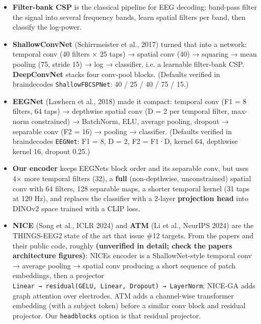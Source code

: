 \documentclass[
  11pt,
]{article}
\providecommand{\tightlist}{%
  \setlength{\itemsep}{0pt}\setlength{\parskip}{0pt}}
\renewcommand{\_}{\oldunderscore\allowbreak}
\begin{document}
\begin{itemize}
\tightlist
\item
  \textbf{Filter-bank CSP} is the
  classical pipeline for EEG decoding:
  band-pass filter the signal into
  several frequency bands, learn spatial
  filters per band, then classify the
  log-power.
\item
  \textbf{ShallowConvNet} (Schirrmeister
  et al., 2017) turned that into a
  network: temporal conv (40 filters ×
  25 taps) → spatial conv (40) →
  squaring → mean pooling (75, stride
  15) → log → classifier, i.e. a
  learnable filter-bank CSP.
  \textbf{DeepConvNet} stacks four
  conv-pool blocks. (Defaults verified
  in braindecode\textquotesingle s
  \texttt{ShallowFBCSPNet}: 40 / 25 / 40
  / 75 / 15.)
\item
  \textbf{EEGNet} (Lawhern et al., 2018)
  made it compact: temporal conv (F1 = 8
  filters, 64 taps) → depthwise spatial
  conv (D = 2 per temporal filter,
  max-norm constrained) → BatchNorm,
  ELU, average pooling, dropout →
  separable conv (F2 = 16) → pooling →
  classifier. (Defaults verified in
  braindecode\textquotesingle s
  \texttt{EEGNet}: F1 = 8, D = 2, F2 =
  F1·D, kernel 64, depthwise kernel 16,
  dropout 0.25.)
\item
  \textbf{Our encoder} keeps
  EEGNet\textquotesingle s block order
  and its separable conv, but uses 4×
  more temporal filters (32), a
  \textbf{full} (non-depthwise,
  unconstrained) spatial conv with 64
  filters, 128 separable maps, a shorter
  temporal kernel (31 taps at 120 Hz),
  and replaces the classifier with a
  2-layer \textbf{projection head} into
  DINOv2 space trained with a CLIP loss.
\item
  \textbf{NICE} (Song et al., ICLR 2024)
  and \textbf{ATM} (Li et al., NeurIPS
  2024) are the THINGS-EEG2 state of the
  art that issue \#12 targets. From the
  papers and their public code, roughly
  \textbf{(unverified in detail; check
  the papers\textquotesingle{}
  architecture figures)}:
  NICE\textquotesingle s encoder is a
  ShallowNet-style temporal conv →
  average pooling → spatial conv
  producing a short sequence of patch
  embeddings, then a projector
  \texttt{Linear\ →\ residual(GELU,\ Linear,\ Dropout)\ →\ LayerNorm};
  NICE-GA adds graph attention over
  electrodes. ATM adds a channel-wise
  transformer embedding (with a subject
  token) before a similar conv block and
  residual projector. Our
  \texttt{head\_blocks} option is that
  residual projector.
\end{itemize}
\end{document}
